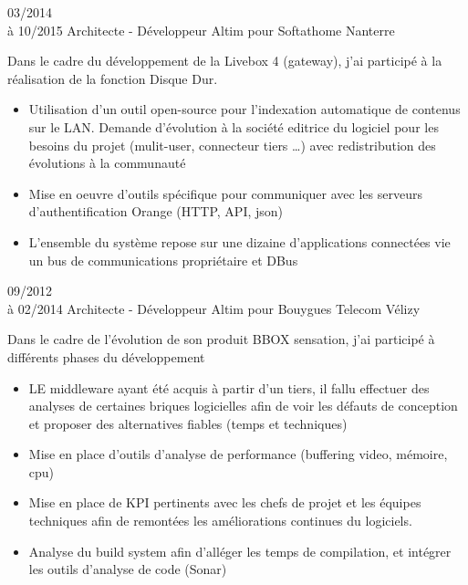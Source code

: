 \documentclass[10pt,a4paper]{moderncv}       %
\begin{document}
\cventry
{03/2014\\à 10/2015}       %
{Architecte - Développeur} %
{Altim pour Softathome}    %
{Nanterre}                 %
{}                         %
{
Dans le cadre du développement de la Livebox 4 (gateway), j'ai
participé à la réalisation de la fonction Disque Dur.
\begin{itemize}
  \item  Utilisation d'un outil open-source pour l'indexation automatique de
  contenus sur le LAN. Demande d'évolution à la société editrice du logiciel
  pour les besoins du projet (mulit-user, connecteur tiers \ldots) avec
  redistribution des évolutions à la communauté
  \item Mise en oeuvre d'outils spécifique pour communiquer avec les serveurs
  d'authentification Orange (HTTP, API, json)
  \item L'ensemble du système repose sur une dizaine d'applications connectées
  vie un bus de communications propriétaire et DBus
\end{itemize}
\newline{}}
\cventry
{09/2012\\à 02/2014}          %
{Architecte - Développeur}    %
{Altim pour Bouygues Telecom} %
{Vélizy}                      %
{}                            %
{Dans le cadre de l'évolution de son produit BBOX sensation, j'ai participé à
différents phases du développement
\begin{itemize}
  \item LE middleware ayant été acquis à partir d'un tiers, il fallu effectuer
  des analyses de certaines briques logicielles afin de voir les défauts de
  conception et proposer des alternatives fiables (temps et techniques)
  \item Mise en place d'outils d'analyse de performance (buffering video,
  mémoire, cpu)
  \item Mise en place de KPI pertinents avec les chefs de projet et les
  équipes techniques afin de remontées les améliorations continues du
  logiciels.
  \item Analyse du build system afin d'alléger les temps de compilation, et
  intégrer les outils d'analyse de code (Sonar)
\end{itemize}
\newline{}}
\end{document}
